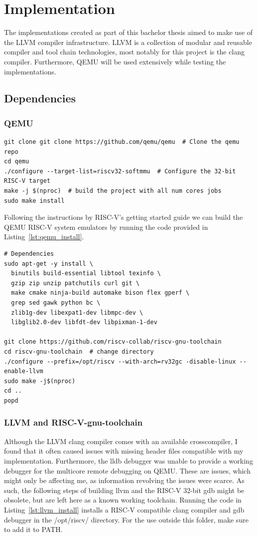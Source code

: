 \section{Implementation}
The implementations created as part of this bachelor thesis aimed to make use of
the LLVM compiler infrastructure. LLVM is a collection of modular and reusable
compiler and tool chain technologies, most notably for this project is the clang
compiler. Furthermore, QEMU will be used extensively while testing the
implementations.

\subsection{Dependencies}
\subsubsection*{QEMU}
\begin{lstlisting}[caption=Installing QEMU, float=*, label=lst:qemu_install]
git clone git clone https://github.com/qemu/qemu  # Clone the qemu repo
cd qemu
./configure --target-list=riscv32-softmmu  # Configure the 32-bit RISC-V target
make -j $(nproc)  # build the project with all num cores jobs
sudo make install
\end{lstlisting}
Following the instructions by RISC-V's getting started guide
we can build the QEMU RISC-V system emulators by running the code
provided in Listing~\ref{lst:qemu_install}\cite{RISC-V_GS}.
\begin{lstlisting}[caption=Installing LLVM compiler infastructure with RISC-V
32-bit as native target., float=*, label=lst:llvm_install]
# Dependencies
sudo apt-get -y install \
  binutils build-essential libtool texinfo \
  gzip zip unzip patchutils curl git \
  make cmake ninja-build automake bison flex gperf \
  grep sed gawk python bc \
  zlib1g-dev libexpat1-dev libmpc-dev \
  libglib2.0-dev libfdt-dev libpixman-1-dev

git clone https://github.com/riscv-collab/riscv-gnu-toolchain
cd riscv-gnu-toolchain  # change directory
./configure --prefix=/opt/riscv --with-arch=rv32gc -disable-linux --enable-llvm
sudo make -j$(nproc)
cd ..
popd
\end{lstlisting}

\subsubsection*{LLVM and RISC-V-gnu-toolchain}
Although the LLVM clang compiler comes with an available crosscompiler, I found
that it often caused issues with missing header files compatible with my
implementation. Furthermore, the lldb debugger was unable to provide a working
debugger for the multicore remote debugging on QEMU. These are issues, which
might only be affecting me, as information revolving the issues were scarce. As
such, the following steps of building llvm and the RISC-V 32-bit gdb might be
obsolete, but are left here as a known working toolchain. Running the code in
Listing~\ref{lst:llvm_install} installs a RISC-V compatible clang compiler and
gdb debugger in the /opt/riscv/ directory. For the use outside this folder, make
sure to add it to PATH.

